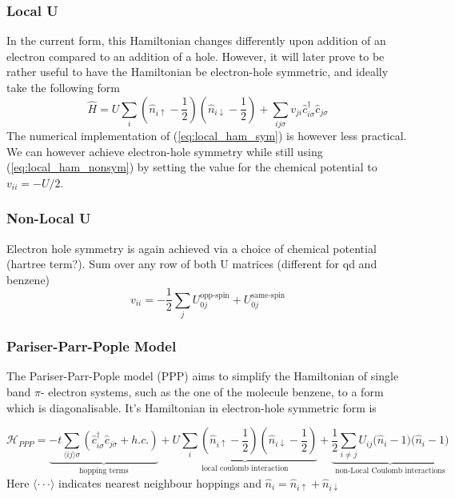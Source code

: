 \subsubsection{Local U}
In the current form, this Hamiltonian changes differently upon addition of an electron compared to an addition of a hole. However, it will later prove to be rather useful to have the Hamiltonian be electron-hole symmetric, and ideally take the following form
\begin{equation}
    \hat{H} = U \sum_i \left(\hat{n}_{i\uparrow}-\frac{1}{2}\right)\left(\hat{n}_{i\downarrow}-\frac{1}{2}\right)+\sum_{i j \sigma} v_{j i} \hat{c}_{i \sigma}^{\dagger} \hat{c}_{j \sigma}\label{eq:local_ham_sym}
\end{equation}
The numerical implementation of (\ref{eq:local_ham_sym}) is however less practical. We can however achieve electron-hole symmetry while still using (\ref{eq:local_ham_nonsym}) by setting the value for the chemical potential to $v_{ii} = -U / 2$.
\medskip

\subsubsection{Non-Local U}
Electron hole symmetry is again achieved via a choice of chemical potential (hartree term?). Sum over any row of both U matrices ({\color{red}different for qd and benzene})
\begin{equation}
    v_{ii} = - \frac{1}{2}\sum_{j} U_{0j}^{\text{opp-spin}} + U_{0j}^{\text{same-spin}}
\end{equation}


\subsubsection{Pariser-Parr-Pople Model}\label{subsec:ppp}

The Pariser-Parr-Pople model (PPP) aims to simplify the Hamiltonian of single band $\pi$- electron systems, such as the one of the molecule benzene, to a form which is diagonalisable. It's Hamiltonian in electron-hole symmetric form is

\begin{equation}
    \mathcal{H}_{PPP} = \underbrace{-t \sum_{\langle ij \rangle \sigma} \left(\hat{c}^\dagger_{i\sigma}\hat{c}_{j\sigma} + h.c.\right) 
    }_{\text{hopping terms}}
    + \underbrace{U \sum_i \left(\hat{n}_{i\uparrow} - \frac{1}{2}\right)\left(\hat{n}_{i\downarrow} - \frac{1}{2}\right)
    }_{\text{local coulomb interaction}}
    + \underbrace{\frac{1}{2}\sum_{i\neq j} U_{ij} \bigg(\hat{n}_{i} - 1\bigg)\bigg(\hat{n}_{i} - 1\bigg)
    }_{\text{non-Local Coulomb interactions}}
\end{equation}
Here $\langle \cdot\cdot\cdot \rangle$ indicates nearest neighbour hoppings and $\hat{n}_i = \hat{n}_{i\uparrow} + \hat{n}_{i\downarrow}$
\\

